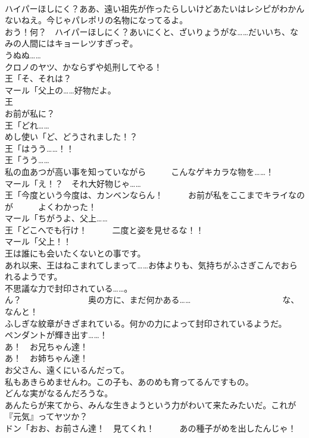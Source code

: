 \documentclass[8pt]{extreport}
\begin{document}
\begin{CJK}{UTF8}{min}
\\	ハイパーほしにく？ああ、遠い祖先が作ったらしいけどあたいはレシピがわかんないねえ。今じゃパレポリの名物になってるよ。	
\\	おう！何？　ハイパーほしにく？あいにくと、ざいりょうがな……だいいち、なみの人間にはキョーレツすぎっぞ。	
\\	うぬぬ……	
\\	クロノのヤツ、かならずや処刑してやる！	
\\	王「そ、それは？	
\\	マール「父上の……好物だよ。	
\\	王
\\	お前が私に？	
\\	王「どれ……	
\\	めし使い「ど、どうされました！？	
\\	王「はうう……！！	
\\	王「うう……	
\\	私の血あつが高い事を知っていながら　　　こんなゲキカラな物を……！	
\\	マール「え！？　それ大好物じゃ……	
\\	王「今度という今度は、カンベンならん！　　　お前が私をここまでキライなのが　　　よくわかった！	
\\	マール「ちがうよ、父上……	
\\	王「どこへでも行け！　　　二度と姿を見せるな！！	
\\	マール「父上！！	
\\	王は誰にも会いたくないとの事です。	
\\	あれ以来、王はねこまれてしまって……お体よりも、気持ちがふさぎこんでおられるようです。	
\\	不思議な力で封印されている……。	
\\	ん？　　　　　　　　奥の方に、まだ何かある……　　　　　　　　　　　な、なんと！	
\\	ふしぎな紋章がきざまれている。何かの力によって封印されているようだ。	
\\	ペンダントが輝き出す……！	
\\	あ！　お兄ちゃん達！	
\\	あ！　お姉ちゃん達！	
\\	お父さん、遠くにいるんだって。	
\\	私もあきらめませんわ。この子も、あのめも育ってるんですもの。	
\\	どんな実がなるんだろうな。	
\\	あんたらが来てから、みんな生きようという力がわいて来たみたいだ。これが『元気』ってヤツか？	
\\	ドン「おお、お前さん達！　見てくれ！　　　あの種子がめを出したんじゃ！	

\end{CJK}
\end{document}

